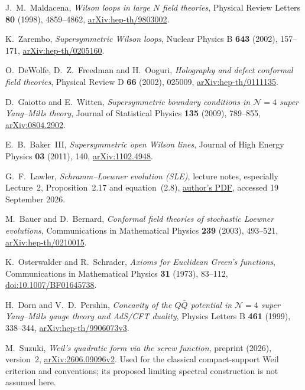 J.~M.~Maldacena, \emph{Wilson loops in large $N$ field theories},
Physical Review Letters \textbf{80} (1998), 4859--4862,
\href{https://arxiv.org/abs/hep-th/9803002}{arXiv:hep-th/9803002}.

K.~Zarembo, \emph{Supersymmetric Wilson loops},
Nuclear Physics B \textbf{643} (2002), 157--171,
\href{https://arxiv.org/abs/hep-th/0205160}{arXiv:hep-th/0205160}.

O.~DeWolfe, D.~Z.~Freedman and H.~Ooguri,
\emph{Holography and defect conformal field theories},
Physical Review D \textbf{66} (2002), 025009,
\href{https://arxiv.org/abs/hep-th/0111135}{arXiv:hep-th/0111135}.

D.~Gaiotto and E.~Witten,
\emph{Supersymmetric boundary conditions in $\mathcal N=4$ super
Yang--Mills theory}, Journal of Statistical Physics \textbf{135}
(2009), 789--855,
\href{https://arxiv.org/abs/0804.2902}{arXiv:0804.2902}.

E.~B.~Baker~III, \emph{Supersymmetric open Wilson lines},
Journal of High Energy Physics \textbf{03} (2011), 140,
\href{https://arxiv.org/abs/1102.4948}{arXiv:1102.4948}.

G.~F.~Lawler, \emph{Schramm--Loewner evolution (SLE)}, lecture notes,
especially Lecture~2, Proposition~2.17 and equation~(2.8),
\href{https://math.uchicago.edu/~lawler/utah.pdf}{author's PDF},
accessed 19 September 2026.

M.~Bauer and D.~Bernard,
\emph{Conformal field theories of stochastic Loewner evolutions},
Communications in Mathematical Physics \textbf{239} (2003), 493--521,
\href{https://arxiv.org/abs/hep-th/0210015}{arXiv:hep-th/0210015}.

K.~Osterwalder and R.~Schrader,
\emph{Axioms for Euclidean Green's functions},
Communications in Mathematical Physics \textbf{31} (1973), 83--112,
\href{https://doi.org/10.1007/BF01645738}{doi:10.1007/BF01645738}.

H.~Dorn and V.~D.~Pershin,
\emph{Concavity of the $Q\bar Q$ potential in $\mathcal N=4$ super
Yang--Mills gauge theory and AdS/CFT duality},
Physics Letters B \textbf{461} (1999), 338--344,
\href{https://arxiv.org/abs/hep-th/9906073v3}{arXiv:hep-th/9906073v3}.

M.~Suzuki, \emph{Weil's quadratic form via the screw function},
preprint (2026), version~2,
\href{https://arxiv.org/abs/2606.09096v2}{arXiv:2606.09096v2}.
Used for the classical compact-support Weil criterion and conventions;
its proposed limiting spectral construction is not assumed here.

